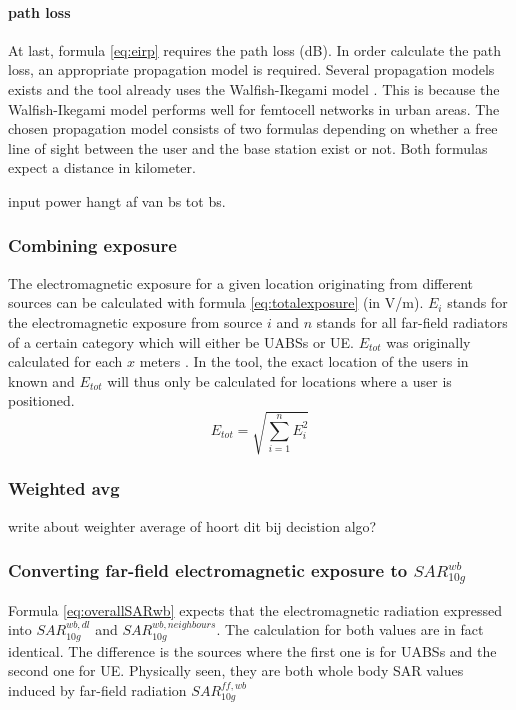 \paragraph{path loss}
\label{subsec:pl}
At last, formula \ref{eq:eirp} requires the path loss (dB). In order calculate the path loss, an appropriate propagation model is required. Several propagation models exists and the tool already uses the Walfish-Ikegami model \cite{J2}.
This is because the Walfish-Ikegami model performs well for femtocell networks in urban areas. %
The chosen propagation model consists of two formulas depending on whether a free line of sight between the user and the base station exist or not. Both formulas expect a distance in kilometer. %

input power hangt af van bs tot bs.

\subsubsection{Combining exposure}
The electromagnetic exposure for a given location originating from different sources can be calculated with formula \ref{eq:totalexposure} (in V/m). $E_i$ stands for 
the electromagnetic exposure from source $i$ and
$n$ stands for all far-field radiators of a certain category which will either be \gls{UABS}s or \gls{UE}.
$E_{tot}$ was originally calculated for each $x$ meters \cite{J1}. In the tool, the exact location of the users in known and $E_{tot}$ will thus 
only be calculated for locations where a user is positioned.
\begin{equation}
E_{tot} = \sqrt{\sum_{i=1}^{n} E_i^2}
\label{eq:totalexposure}
\end{equation}

\subsubsection{Weighted avg}
write about weighter average of hoort dit bij decistion algo?

\subsubsection{Converting far-field electromagnetic exposure to $SAR^{wb}_{10g}$}
\label{sub:convertDLtosarwb}

Formula \ref{eq:overallSARwb} expects that the electromagnetic radiation expressed into $SAR^{wb,dl}_{10g}$ and $SAR^{wb,neighbours}_{10g}$. The 
calculation for both values are in fact identical. The difference is the sources where the first one is for \gls{UABS}s and the second one for \gls{UE}.
Physically seen, they are both whole body SAR values induced by far-field radiation $SAR^{ff,wb}_{10g}$

